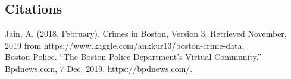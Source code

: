 \documentclass[a0,landscape]{a0poster}
\newtheorem{theorem}{Theorem}[section]
\newtheorem{corollary}[theorem]{Corollary}
\let\Section=\section
\def\section{\setcounter{equation}{0}\Section}
\newcommand{\1}{\bold{1}}
\begin{document}
\begin{multicols}{3}
\section*{Citations}

Jain, A. (2018, February). Crimes in Boston, Version 3. Retrieved November, 2019 from https://www.kaggle.com/ankkur13/boston-crime-data.\\
Boston Police. “The Boston Police Department's Virtual Community.” Bpdnews.com, 7 Dec. 2019, https://bpdnews.com/.




%
%
%
%
%
%
%
%
%
%
%

\end{multicols}
\end{document}
